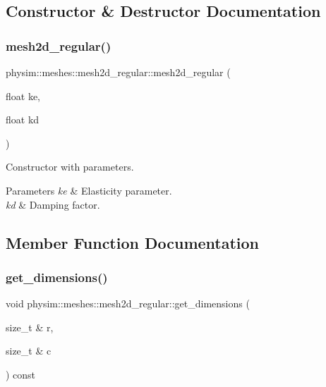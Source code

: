 \subsection{Constructor \& Destructor Documentation}
\mbox{\label{classphysim_1_1meshes_1_1mesh2d__regular_acaae970247d081125fc7c77368aafc07}} 
\subsubsection{\texorpdfstring{mesh2d\+\_\+regular()}{mesh2d\_regular()}}
{\footnotesize\ttfamily physim\+::meshes\+::mesh2d\+\_\+regular\+::mesh2d\+\_\+regular (\begin{DoxyParamCaption}\item[{float}]{ke,  }\item[{float}]{kd }\end{DoxyParamCaption})}



Constructor with parameters. 


\begin{DoxyParams}{Parameters}
{\em ke} & Elasticity parameter. \\
\hline
{\em kd} & Damping factor. \\
\hline
\end{DoxyParams}


\subsection{Member Function Documentation}
\mbox{\label{classphysim_1_1meshes_1_1mesh2d__regular_a26fcf2ed9c0532a33e524a5f1728dbdf}} 
\subsubsection{\texorpdfstring{get\+\_\+dimensions()}{get\_dimensions()}}
{\footnotesize\ttfamily void physim\+::meshes\+::mesh2d\+\_\+regular\+::get\+\_\+dimensions (\begin{DoxyParamCaption}\item[{size\+\_\+t \&}]{r,  }\item[{size\+\_\+t \&}]{c }\end{DoxyParamCaption}) const}



